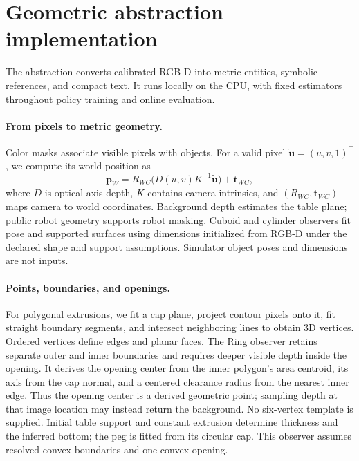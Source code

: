 \section{Geometric abstraction implementation}
\label{app:geometric-abstraction}

The abstraction converts calibrated RGB-D into metric entities, symbolic
references, and compact text. It runs locally on the CPU, with fixed estimators
throughout policy training and online evaluation.

\paragraph{From pixels to metric geometry.}
Color masks associate visible pixels with objects. For a valid pixel
$\tilde{\mathbf u}=(u,v,1)^\top$, we compute its world position as
\begin{equation}
  \mathbf p_W=R_{WC}\bigl(D(u,v)K^{-1}\tilde{\mathbf u}\bigr)+\mathbf t_{WC},
\end{equation}
where $D$ is optical-axis depth, $K$ contains camera intrinsics, and
$(R_{WC},\mathbf t_{WC})$ maps camera to world coordinates. Background depth
estimates the table plane; public robot geometry supports robot masking.
Cuboid and cylinder observers fit pose and supported surfaces using dimensions
initialized from RGB-D under the declared shape and support assumptions.
Simulator object poses and dimensions are not inputs.

\paragraph{Points, boundaries, and openings.}
For polygonal extrusions, we fit a cap plane, project contour pixels onto it,
fit straight boundary segments, and intersect neighboring lines to obtain 3D
vertices. Ordered vertices define edges and planar faces. The Ring observer
retains separate outer and inner boundaries and requires deeper visible depth
inside the opening. It derives the opening center from the inner polygon's area
centroid, its axis from the cap normal, and a centered clearance radius from the
nearest inner edge. Thus the opening center is a derived geometric point;
sampling depth at that image location may instead return the background.
No six-vertex template is supplied. Initial table support and constant extrusion
determine thickness and the inferred bottom; the peg is fitted from its circular
cap. This observer assumes resolved convex boundaries and one convex opening.

